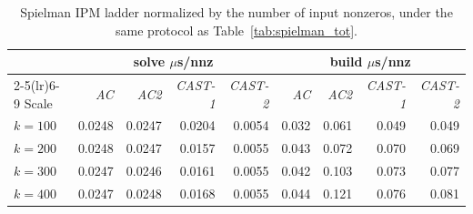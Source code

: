 \documentclass{article}
\newcommand{\CASTone}{\textit{CAST-1}\xspace}
\newcommand{\CASTtwo}{\textit{CAST-2}\xspace}
\newcommand{\AC}{\textit{AC}\xspace}
\newcommand{\ACtwo}{\textit{AC2}\xspace}
\newcommand{\1}{\mathbbm{1}}
\theoremstyle{plain}
\begin{document}
\begin{table}[!ht]
\centering
\caption{Spielman IPM ladder normalized by the number of input nonzeros, under the same protocol as Table~\ref{tab:spielman_tot}.}
\label{tab:spielman_nnz}
\small
\begin{tabular}{l rrrr rrrr}
\toprule
& \multicolumn{4}{c}{solve $\mu$s/nnz} &
\multicolumn{4}{c}{build $\mu$s/nnz} \\
\cmidrule(lr){2-5}\cmidrule(lr){6-9}
Scale & \AC & \ACtwo & \CASTone & \CASTtwo &
\AC & \ACtwo & \CASTone & \CASTtwo \\
\midrule
$k=100$   & 0.0248 & 0.0247 & 0.0204 & 0.0054 & 0.032 & 0.061 & 0.049 & 0.049 \\
$k=200$   & 0.0248 & 0.0247 & 0.0157 & 0.0055 & 0.043 & 0.072 & 0.070 & 0.069 \\
$k=300$ & 0.0247 & 0.0246 & 0.0161 & 0.0055 & 0.042 & 0.103 & 0.073 & 0.077 \\
$k=400$ & 0.0247 & 0.0248 & 0.0168 & 0.0055 &
0.044 & 0.121 & 0.076 & 0.081 \\
\bottomrule
\end{tabular}
\end{table}
 
\end{document}
